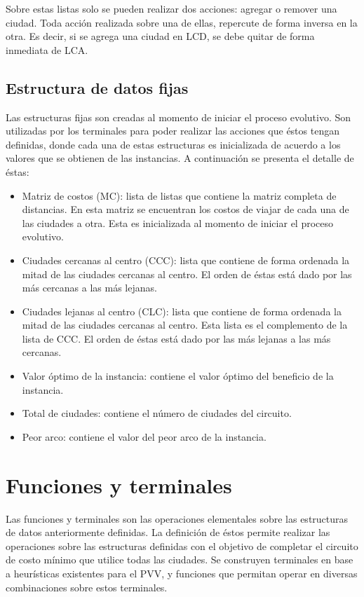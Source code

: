 Sobre estas listas solo se pueden realizar dos acciones: agregar o remover una ciudad. Toda acción realizada sobre una de ellas, repercute de forma inversa en la otra. Es decir, si se agrega una ciudad en LCD, se debe quitar de forma inmediata de LCA.

\subsection{Estructura de datos fijas}

Las estructuras fijas son creadas al momento de iniciar el proceso evolutivo. Son utilizadas por los terminales para poder realizar las acciones que éstos tengan definidas, donde cada una de estas estructuras es inicializada de acuerdo a los valores que se obtienen de las instancias. A continuación se presenta el detalle de éstas:

\begin{itemize}
	\item Matriz de costos (MC): lista de listas que contiene la matriz completa de distancias. En esta matriz se encuentran los costos de viajar de cada una de las ciudades a otra. Esta es inicializada al momento de iniciar el proceso evolutivo.
	\item Ciudades cercanas al centro (CCC): lista que contiene de forma ordenada la mitad de las ciudades cercanas al centro. El orden de éstas está dado por las más cercanas a las más lejanas.
	\item Ciudades lejanas al centro (CLC): lista que contiene de forma ordenada la mitad de las ciudades cercanas al centro. Esta lista es el complemento de la lista de CCC. El orden de éstas está dado por las más lejanas a las más cercanas.
	\item Valor óptimo de la instancia: contiene el valor óptimo del beneficio de la instancia.
	\item Total de ciudades: contiene el número de ciudades del circuito.
	\item Peor arco: contiene el valor del peor arco de la instancia.
\end{itemize}

\section{Funciones y terminales}

Las funciones y terminales son las operaciones elementales sobre las estructuras de datos anteriormente definidas. La definición de éstos permite realizar las operaciones sobre las estructuras definidas con el objetivo de completar el circuito de costo mínimo que utilice todas las ciudades. Se construyen terminales en base a heurísticas existentes para el PVV, y funciones que permitan operar en diversas combinaciones sobre estos terminales.

